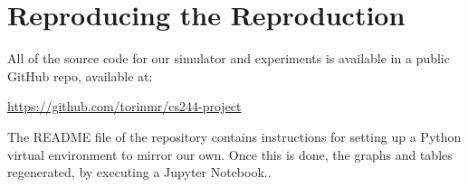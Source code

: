 \section{Reproducing the Reproduction}
All of the source code for our simulator and experiments is available in a public GitHub repo, available at:

\vspace{1em}
\url{https://github.com/torinmr/cs244-project}
\vspace{1em}

The README file of the repository contains instructions for setting up a Python virtual environment to mirror our own. Once this is done, the graphs and tables regenerated, by executing a Jupyter Notebook.\cite{jupyter}.

